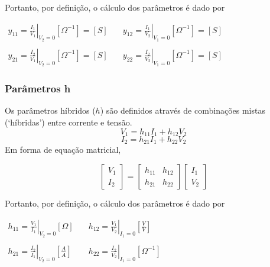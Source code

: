 \documentclass{article}
\numberwithin{equation}{section}
\begin{document}
    Portanto, por definição, o cálculo dos parâmetros é dado por
    \begin{center}
        $\begin{matrix} %
                y_{11}=\displaystyle\left.\frac{I_{1}}{V_{1}}\right|_{V_{2}=0} [\Omega^{-1}]=[S] &\quad y_{12}=\displaystyle\left.\frac{I_{1}}{V_{2}}\right|_{V_{1}=0} [\Omega^{-1}]=[S]\\ \\
                y_{21}=\displaystyle\left.\frac{I_{2}}{V_{1}}\right|_{V_{2}=0} [\Omega^{-1}]=[S] &\quad y_{22}=\displaystyle\left.\frac{I_{2}}{V_{2}}\right|_{V_{1}=0} [\Omega^{-1}]=[S]
        \end{matrix}$
    \end{center}


    \subsubsection{Parâmetros h}
    \label{subsubsec:quadripolosh}
    Os parâmetros híbridos ($h$) são definidos através de combinações mistas (`híbridas') entre corrente e tensão.
    \begin{equation*}
        V_{1}=h_{11}I_{1}+h_{12}V_{2}
    \end{equation*}
    \begin{equation*}
        I_{2}=h_{21}I_{1}+h_{22}V_{2}
    \end{equation*}
    Em forma de equação matricial,

    \begin{equation}
        \begin{bmatrix}
            V_{1} \\
            I_{2}
        \end{bmatrix}
        = %
        \begin{bmatrix}
            h_{11} & h_{12} \\
            h_{21} & h_{22}
        \end{bmatrix}
        \begin{bmatrix}
            I_{1} \\
            V_{2}
        \end{bmatrix}
    \end{equation}

    Portanto, por definição, o cálculo dos parâmetros é dado por
    \begin{center}
        $\begin{matrix} %
                h_{11}=\displaystyle\left.\frac{V_{1}}{I_{1}}\right|_{V_{2}=0} [\Omega] &\quad h_{12}=\displaystyle\left.\frac{V_{1}}{V_{2}}\right|_{I_{1}=0}\left[\frac{V}{V}\right]\\\\
                h_{21}=\displaystyle\left.\frac{I_{2}}{I_{1}}\right|_{V_{2}=0}\left[\frac{A}{A}\right]&\quad
                h_{22}=\displaystyle\left.\frac{I_{2}}{V_{2}}\right|_{I_{1}=0} [\Omega^{-1}]
        \end{matrix}$
    \end{center}
\end{document}
